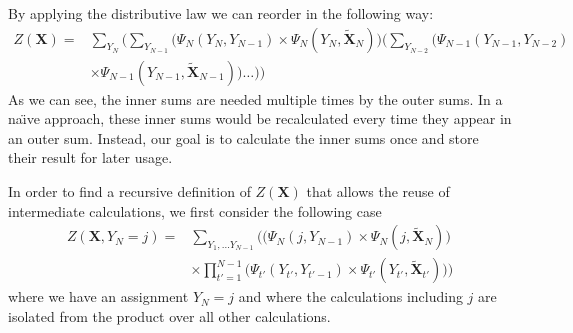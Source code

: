 \bigskip

By applying the distributive law we can reorder  in the following way:
\begin{equation}
  \label{equ:linear-chain-crf-z-distributive}
  \begin{split}
  Z(\bm{X}) = & \sum_{Y_N}\Bigg(\sum_{Y_{N-1}}\Big(\Psi_N(Y_N,Y_{N-1})\times\Psi_N(Y_N,\bm{\tilde{X}}_N)\Big)\bigg(\sum_{Y_{N-2}}\Big(\Psi_{N-1}(Y_{N-1},Y_{N-2})\\
  & \times\Psi_{N-1}(Y_{N-1},\bm{\tilde{X}}_{N-1})\Big) \dots\bigg)\Bigg)
  \end{split}
\end{equation}
As we can see, the inner sums are needed multiple times by the outer sums.
In a na\"{\i}ve approach, these inner sums would be recalculated every time they appear in an outer sum.
Instead, our goal is to calculate the inner sums once and store their result for later usage.

\bigskip

In order to find a recursive definition of $Z(\bm{X})$ that allows the reuse of intermediate calculations, we first consider the following case
\begin{equation}
  \label{equ:linear-chain-crf-z-j-1}
  \begin{split}
    Z(\bm{X},Y_N=j) = & \sum_{Y_1,\dots Y_{N-1}}\bigg(\Big(\Psi_N(j,Y_{N-1})\times\Psi_N(j,\bm{\tilde{X}}_N)\Big) \\
    & \times\prod_{t'=1}^{N-1}\Big(\Psi_{t'}(Y_{t'},Y_{t'-1})\times\Psi_{t'}(Y_{t'},\bm{\tilde{X}}_{t'})\Big)\bigg)
  \end{split}
\end{equation}
where we have an assignment $Y_N=j$ and where the calculations including $j$ are isolated from the product over all other calculations.

